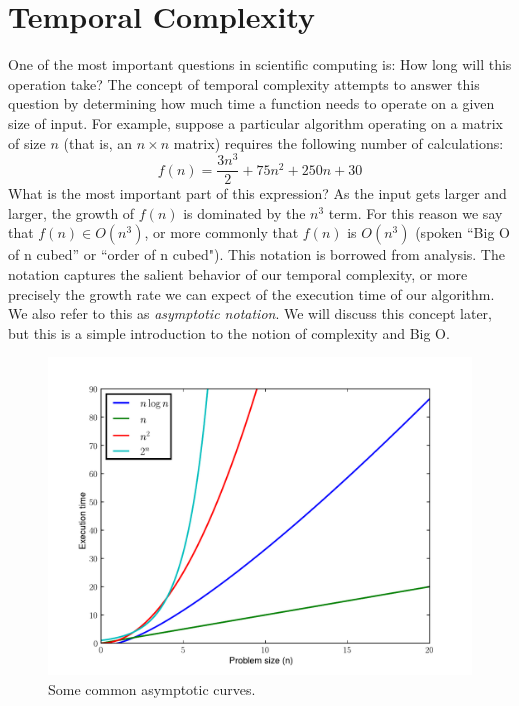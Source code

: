 

\section*{Temporal Complexity}
One of the most important questions in scientific computing is:
How long will this operation take?
The concept of temporal complexity attempts to answer this question by determining
how much time a function needs to operate on a given size of input.
For example, suppose a particular algorithm operating on a matrix of size $n$
(that is, an $n \times n$ matrix)
requires the following number of calculations:
\begin{equation*}
f(n) = \frac{3n^3}{2} + 75n^2 + 250n + 30
\end{equation*}
What is the most important part of this expression?
As the input gets larger and larger, the growth of $f(n)$ is dominated by the $n^3$ term.
For this reason we say that $f(n) \in O(n^3)$, or more commonly that $f(n)$ is $O(n^3)$
(spoken ``Big O of n cubed'' or ``order of n cubed").
This notation is borrowed from analysis. The notation captures the salient behavior of our temporal complexity,
or more precisely the growth rate we can expect of the execution time of our algorithm.
We also refer to this as \emph{asymptotic notation}.
We will discuss this concept later, but this is a simple introduction to the notion of complexity and Big O.
\begin{figure}[h]
\centering
\includegraphics[width=\textwidth]{complexitycurves.pdf}
\caption{Some common asymptotic curves.}
\end{figure}

